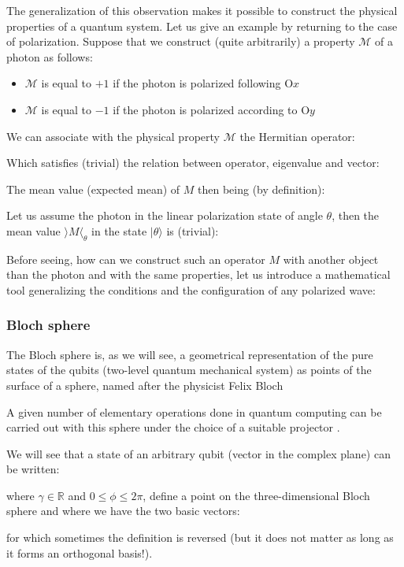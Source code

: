 	The generalization of this observation makes it possible to construct the physical properties of a quantum system. Let us give an example by returning to the case of polarization. Suppose that we construct (quite arbitrarily) a property $\mathcal{M}$ of a photon as follows:
	\begin{itemize}
		\item $\mathcal{M}$ is equal to $+1$ if the photon is polarized following O$x$

		\item $\mathcal{M}$ is equal to $-1$ if the photon is polarized according to O$y$
	\end{itemize}
	We can associate with the physical property $\mathcal{M}$ the Hermitian operator:
	
	Which satisfies (trivial) the relation between operator, eigenvalue and vector:
	
	The mean value (expected mean) of $M$ then being (by definition):
	
	Let us assume the photon in the linear polarization state of angle $\theta$, then the mean value $\rangle M \langle_\theta$ in the state $|\theta\rangle$ is (trivial):
	
	Before seeing, how can we construct such an operator $M$ with another object than the photon and with the same properties, let us introduce a mathematical tool generalizing the conditions and the configuration of any polarized wave:
	
	\subsubsection{Bloch sphere}
	The Bloch sphere is, as we will see, a geometrical representation of the pure states of the qubits (two-level quantum mechanical system) as points of the surface of a sphere, named after the physicist Felix Bloch

	A given number of elementary operations done in quantum computing can be carried out with this sphere under the choice of a suitable projector .

	We will see that a state of an arbitrary qubit (vector in the complex plane) can be written:
	
	where $\gamma\in\mathbb{R}$ and $0\le \phi\leq 2\pi$, define a point on the three-dimensional Bloch sphere and where we have the two basic vectors:
	
	for which sometimes the definition is reversed (but it does not matter as long as it forms an orthogonal basis!).

